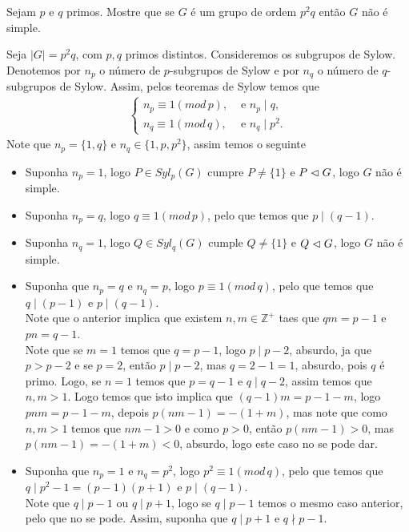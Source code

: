 \begin{homeworkProblem}[6]
  Sejam $p$ e $q$ primos. Mostre que se $G$ é um grupo de ordem $p^{2}q$ então $G$ não é simple. 
  \begin{solution}
    Seja $|G|=p^{2}q$, com $p,q$ primos distintos. Consideremos os subgrupos de Sylow.\\
    Denotemos por $n_p$ o número de $p$-subgrupos de Sylow e por $n_q$ o número de $q$-subgrupos de Sylow. Assim, pelos teoremas de Sylow temos que
    \begin{align*}
      \begin{cases}
        n_p\equiv 1(mod\,p), &\text{ e } n_p\mid q \text{,} \\
        n_q\equiv 1(mod\,q), &\text{ e } n_q\mid p^{2}.
      \end{cases}
    \end{align*}
    Note que $n_p=\{1,q\}$ e $n_q\in\{1,p,p^{2}\}$, assim temos o seguinte
    \begin{itemize}
      \item Suponha $n_p=1$, logo $P\in Syl_{p}(G)$ cumpre $P\neq \{1\}$ e $P\vartriangleleft G$, logo $G$ não é simple.
      \item Suponha $n_p=q$, logo $q\equiv 1(mod\,p)$, pelo que temos que $p\mid (q-1)$.
      \item Suponha $n_q=1$, logo $Q\in Syl_{q}(G)$ cumple $Q\neq\{1\}$ e $Q\vartriangleleft G$, logo $G$ não é simple.
      \item Suponha que $n_p=q$ e $n_q=p$, logo $p\equiv 1(mod\, q)$, pelo que temos que $q\mid (p-1)$ e $p\mid (q-1)$.\\
        Note que o anterior implica que existem $n,m\in\mathbb{Z}^{+ }$ taes que $qm=p-1$ e $pn=q-1$.\\
        Note que se $m=1$ temos que $q=p-1$, logo $p\mid p-2$, absurdo, ja que $p>p-2$ e se $p=2$, então $p\mid p-2$, mas $q=2-1=1$, absurdo, pois $q$ é primo. Logo, se $n=1$ temos que $p=q-1$ e $q\mid q-2$, assim temos que $n,m>1$. Logo temos que isto implica que $(q-1)m=p-1-m$, logo $pnm=p-1-m$, depois $p(nm-1)=-(1+m)$, mas note que como $n,m>1$ temos que $nm-1>0$ e como $p>0$, então $p(nm-1)>0$, mas $p(nm-1)=-(1+m)<0$, absurdo, logo este caso no se pode dar. 
      \item Suponha que $n_p=1$ e $n_q=p^{2}$, logo $p^{2}\equiv 1(mod\,q)$, pelo que temos que $q\mid p^{2}-1=(p-1)(p+1)$ e $p\mid (q-1)$.\\
        Note que $q\mid p-1$ ou $q\mid p+1$, logo se $q\mid p-1$ temos o mesmo caso anterior, pelo que no se pode. Assim, suponha que $q\mid p+1$ e $q\nmid p-1$.\\

\end{itemize}
\end{solution}
\end{homeworkProblem}

